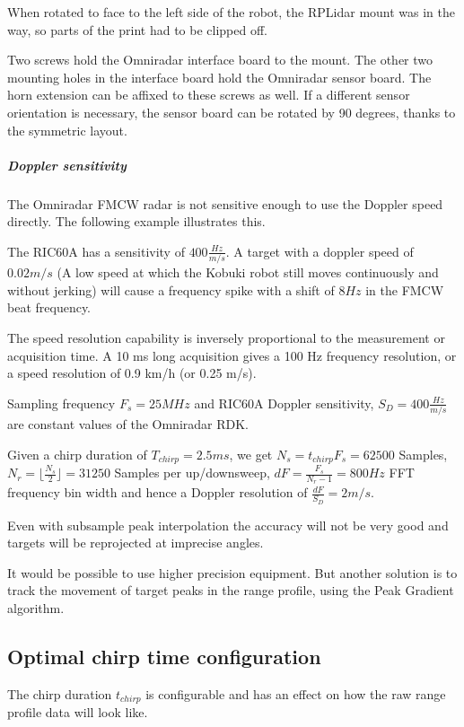 When rotated to face to the left side of the robot, the RPLidar mount
was in the way, so parts of the print had to be clipped off.

Two screws hold the Omniradar interface board to the mount. The other
two mounting holes in the interface board hold the Omniradar sensor
board. The horn extension can be affixed to these screws as well. If a
different sensor orientation is necessary, the sensor board can be
rotated by 90 degrees, thanks to the symmetric layout.

\subparagraph{Doppler sensitivity}\label{doppler-sensitivity}

The Omniradar FMCW radar is not sensitive enough to use the Doppler
speed directly. The following example illustrates this.

The RIC60A has a sensitivity of \(400 \frac{Hz}{m/s}\). A target with a
doppler speed of \(0.02 m/s\) (A low speed at which the Kobuki robot
still moves continuously and without jerking) will cause a frequency
spike with a shift of \(8Hz\) in the FMCW beat frequency.

The speed resolution capability is inversely proportional to the
measurement or acquisition time. A 10 ms long acquisition gives a 100 Hz
frequency resolution, or a speed resolution of 0.9 km/h (or 0.25 m/s).

Sampling frequency \(F_s=25MHz\) and RIC60A Doppler sensitivity,
\(S_D = 400 \frac{Hz}{m/s}\) are constant values of the Omniradar RDK.

Given a chirp duration of \(T_{chirp} = 2.5ms\), we get
\(N_s = t_{chirp} F_s = 62500\) Samples,
\(N_r = \lfloor \frac{N_s}{2} \rfloor = 31250\) Samples per
up/downsweep, \(dF = \frac{F_s}{N_r - 1} = 800 Hz\) FFT frequency bin
width and hence a Doppler resolution of \(\frac{dF}{S_D} = 2 m/s\).

Even with subsample peak interpolation the accuracy will not be very
good and targets will be reprojected at imprecise angles.

It would be possible to use higher precision equipment. But another
solution is to track the movement of target peaks in the range profile,
using the Peak Gradient algorithm.

\subsection{Optimal chirp time configuration}\label{optimal-chirp-time-configuration}

The chirp duration \(t_{chirp}\) is configurable and has an effect on
how the raw range profile data will look like.

